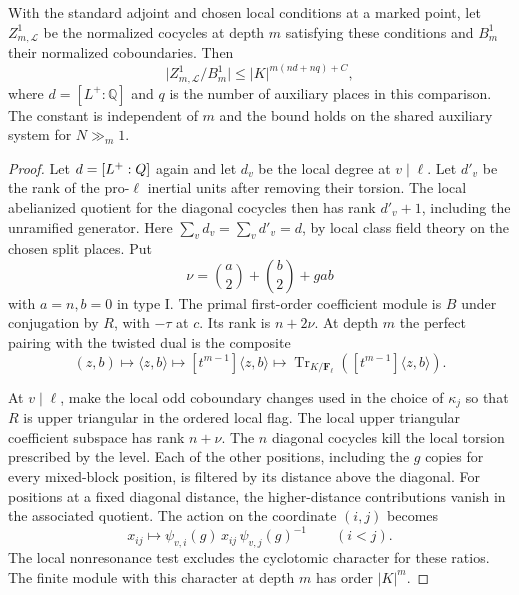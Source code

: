\begin{proposition}
\label{prop:marked-first-order-bound}
With the standard adjoint and chosen local conditions at a marked
point, let \(Z^1_{m,\mathcal L}\) be the normalized cocycles at depth \(m\) satisfying these conditions and \(B_m^1\) their normalized coboundaries. Then
\[
                       \bigl|Z^1_{m,\mathcal L}/B_m^1\bigr|\le |K|^{m(nd+nq)+C},
\]
where \(d=[L^+:\mathbb Q]\) and \(q\) is the number of auxiliary
places in this comparison. The constant is independent of \(m\)
and the bound holds on the shared auxiliary system for \(N\gg_m1\).
\end{proposition}

\begin{proof}
Let \(d=[L^+:Q]\) again and let \(d_v\) be the local degree
at \(v\mid\ell\). Let \(d'_v\) be the rank of the pro-\(\ell\)
inertial units after removing their torsion. The local
abelianized quotient for the diagonal cocycles then has
rank \(d'_v+1\), including the unramified generator.
Here \(\sum_v d_v=\sum_v d'_v=d\), by local class field
theory on the chosen split places. Put
\[
 \nu=\binom{a}{2}+\binom{b}{2}+gab
\]
with \(a=n,b=0\) in type I. The primal first-order
coefficient module is \(B\) under conjugation by \(R\),
with \(-\tau\) at \(c\). Its rank is \(n+2\nu\).
At depth \(m\) the perfect pairing with the twisted dual is the composite 
\[
 (z,b)\longmapsto \langle z,b\rangle\longmapsto [t^{m-1}]\langle z,b\rangle\longmapsto \operatorname{Tr}_{K/\mathbf F_\ell}\!\left([t^{m-1}]\langle z,b\rangle\right).
\]

At \(v\mid\ell\), make the local odd coboundary changes
used in the choice of \(\kappa_j\) so that \(R\) is
upper triangular in the ordered local flag. The
local upper triangular coefficient subspace has
rank \(n+\nu\). The \(n\) diagonal cocycles kill the
local torsion prescribed by the level. Each of the
other positions, including the \(g\) copies for every
mixed-block position, is filtered by its distance
above the diagonal. For positions at a fixed diagonal distance, the higher-distance contributions vanish in the associated quotient. The action on the coordinate \((i,j)\) becomes
\[
 x_{ij}\longmapsto\psi_{v,i}(g)\,x_{ij}\,\psi_{v,j}(g)^{-1}\qquad(i<j).
\] The local
nonresonance test excludes the cyclotomic character
for these ratios. The finite module with this
character at depth \(m\) has order \(|K|^m\).


\end{proof}
